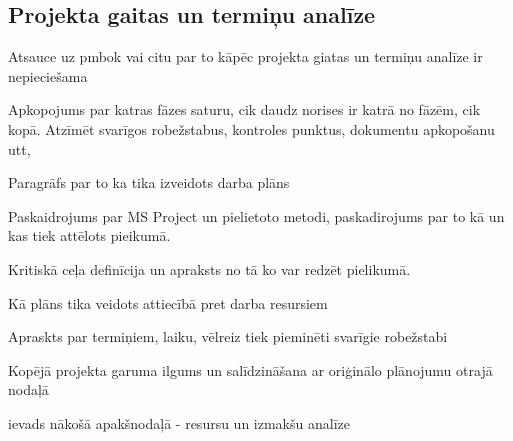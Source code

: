 \subsection{Projekta gaitas un termiņu analīze}
Atsauce uz pmbok vai citu par to kāpēc projekta giatas un termiņu analīze ir nepieciešama
\par
Apkopojums par katras fāzes saturu, cik daudz norises ir katrā no fāzēm, cik kopā. 
Atzīmēt svarīgos robežstabus, kontroles punktus, dokumentu apkopošanu utt,
\par
Paragrāfs par to ka tika izveidots darba plāns
\par
Paskaidrojums par MS Project un pielietoto metodi, paskadirojums par to kā un kas tiek attēlots
pieikumā. 
\par
Kritiskā ceļa definīcija un apraksts no tā ko var redzēt pielikumā.
\par
Kā plāns tika veidots attiecībā pret darba resursiem
\par
Apraskts par termiņiem, laiku, vēlreiz tiek pieminēti svarīgie robežstabi
\par
Kopējā projekta garuma ilgums un salīdzināšana ar oriģinālo plānojumu otrajā nodaļā
\par
ievads nākošā apakšnodaļā - resursu un izmakšu analīze

